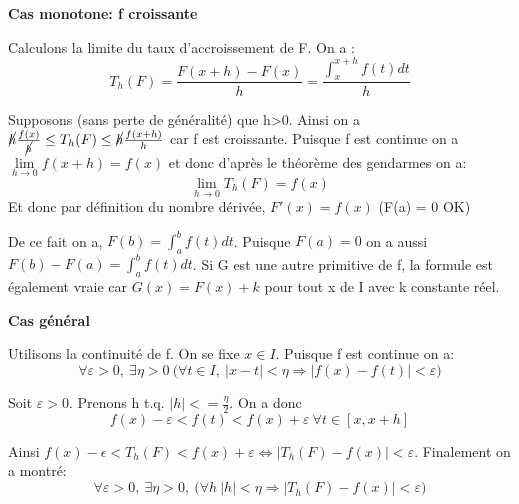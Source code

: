 \begin{Proof}
  \textbf{Cas monotone: f croissante}

  Calculons la limite du taux d'accroissement de F. On a :
  \[
    T_h(F) = \frac{F(x+h)-F(x)}{h} = \frac{\int_x^{x+h} f(t) dt}{h}
  \]

  Supposons (sans perte de généralité) que h>0. Ainsi on a $\cancel{h}
  \frac{f(x)}{\cancel{h}} \leq T_h(F) \leq \cancel h \frac{f(x+h)}{h}$
  car f est croissante. Puisque f est continue on a $\lim
  \limits_{h\to 0} f(x+h) = f(x)$ et donc d'après le théorème des
  gendarmes on a:
  \[
    \lim \limits_{h \to 0} T_h(F) = f(x)
  \]
  Et donc par définition du nombre dérivée, $F'(x) = f(x)$ (F(a) = 0 OK)

  De ce fait on a, $F(b) = \int_a^b f(t) dt$. Puisque $F(a) = 0$ on a
  aussi $F(b)-F(a) = \int_a^b f(t)dt$. Si G est une autre primitive de
  f, la formule est également vraie car $G(x) = F(x)+k$ pour tout x de
  I avec k constante réel.

  \textbf{Cas général}
  
  Utilisons la continuité de f. On se fixe $x \in I$. Puisque f est continue on a:
  \[
    \forall \varepsilon>0, ~ \exists \eta>0 ~\big( \forall t \in I,~ |x-t|<\eta
    \Rightarrow |f(x)-f(t)|<\varepsilon \big)
  \]

  Soit $\varepsilon >0$. Prenons h t.q. $|h|<=\frac{\eta}{2}$. On a donc
  \[
    f(x) - \varepsilon < f(t) < f(x) + \varepsilon ~ \forall t \in [x,x+h]
  \]

  Ainsi $f(x)-\epsilon < T_h(F) < f(x)+\varepsilon \Leftrightarrow
  |T_h(F) - f(x)| < \varepsilon $. Finalement on a montré:
  \[
    \forall \varepsilon > 0, ~ \exists \eta>0,~\big( \forall h ~ |h| < \eta
    \Rightarrow |T_h(F) - f(x)|<\varepsilon \big) 
  \]
  
\end{Proof}

